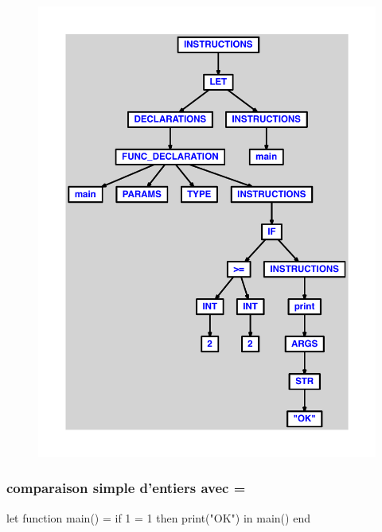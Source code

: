 \documentclass{article}
\begin{document}
\begin{figure}[H]\centering\includegraphics[max width=\textwidth]{ast/ast_170.pdf}\end{figure}\subsubsection{comparaison simple d'entiers avec =}
\begin{verbatimtab}
let
	function main() =
		if 1 = 1 then print("OK")
in main() end
\end{verbatimtab}
\end{document}
